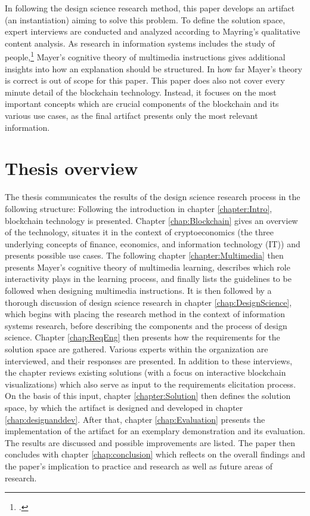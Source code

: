 In following the design science research method, this paper develops an artifact (an instantiation) aiming to solve this problem. To define the solution space, expert interviews are conducted and analyzed according to Mayring's qualitative content analysis. As research in information systems includes the study of people,\footcite[Cf.][p.11]{OsterleGestaltungsorientierteWirtschaftsinformatikPladoyer2010} Mayer's cognitive theory of multimedia instructions gives additional insights into how an explanation should be structured. In how far Mayer's theory is correct is out of scope for this paper. This paper does also not cover every minute detail of the blockchain technology. Instead, it focuses on the most important concepts which are crucial components of the blockchain and its various use cases, as the final artifact presents only the most relevant information. 
    
\section{Thesis overview} \label{sec:ThesisOverview}
The thesis communicates the results of the design science research process in the following structure: Following the introduction in chapter \ref{chapter:Intro}, blockchain technology is presented. Chapter \ref{chap:Blockchain} gives an overview of the technology, situates it in the context of cryptoeconomics (the three underlying concepts of finance, economics, and information technology (\acs{IT})) and presents possible use cases. The following chapter \ref{chapter:Multimedia} then presents Mayer's cognitive theory of multimedia learning, describes which role interactivity plays in the learning process, and finally lists the guidelines to be followed when designing multimedia instructions. It is then followed by a thorough discussion of design science research in chapter \ref{chap:DesignScience}, which begins with placing the research method in the context of information systems research, before describing the components and the process of design science. Chapter \ref{chap:ReqEng} then presents how the requirements for the solution space are gathered. Various experts within the organization are interviewed, and their responses are presented. In addition to these interviews, the chapter reviews existing solutions (with a focus on interactive blockchain visualizations) which also serve as input to the requirements elicitation process. On the basis of this input, chapter \ref{chapter:Solution} then defines the solution space, by which the artifact is designed and developed in chapter \ref{chap:designanddev}. After that, chapter \ref{chap:Evaluation} presents the implementation of the artifact for an exemplary demonstration and its evaluation. The results are discussed and possible improvements are listed. The paper then concludes with chapter \ref{chap:conclusion} which reflects on the overall findings and the paper's implication to practice and research as well as future areas of research.

